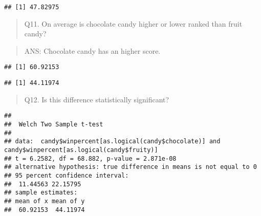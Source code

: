 \documentclass[
]{article}
\newenvironment{Shaded}{\begin{snugshade}}{\end{snugshade}}
\newcommand{\FunctionTok}[1]{\textcolor[rgb]{0.13,0.29,0.53}{\textbf{#1}}}
\newcommand{\NormalTok}[1]{#1}
\newcommand{\SpecialCharTok}[1]{\textcolor[rgb]{0.81,0.36,0.00}{\textbf{#1}}}
\begin{document}
\begin{verbatim}
## [1] 47.82975
\end{verbatim}

\begin{quote}
Q11. On average is chocolate candy higher or lower ranked than fruit
candy?
\end{quote}

\begin{quote}
ANS: Chocolate candy has an higher score.
\end{quote}

\begin{Shaded}
\end{Shaded}

\begin{verbatim}
## [1] 60.92153
\end{verbatim}

\begin{Shaded}
\end{Shaded}

\begin{verbatim}
## [1] 44.11974
\end{verbatim}

\begin{quote}
Q12. Is this difference statistically significant?
\end{quote}

\begin{Shaded}
\end{Shaded}

\begin{verbatim}
## 
##  Welch Two Sample t-test
## 
## data:  candy$winpercent[as.logical(candy$chocolate)] and candy$winpercent[as.logical(candy$fruity)]
## t = 6.2582, df = 68.882, p-value = 2.871e-08
## alternative hypothesis: true difference in means is not equal to 0
## 95 percent confidence interval:
##  11.44563 22.15795
## sample estimates:
## mean of x mean of y 
##  60.92153  44.11974
\end{verbatim}
\end{document}
